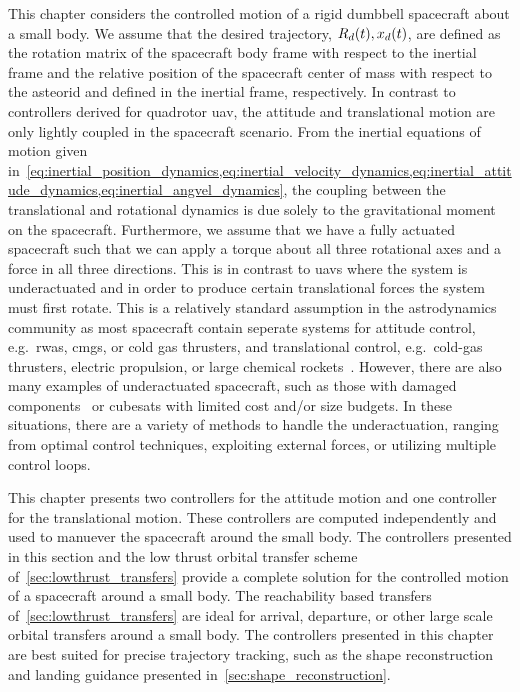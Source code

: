 This chapter considers the controlled motion of a rigid dumbbell spacecraft about a small body.
We assume that the desired trajectory, \( R_d(t), x_d(t) \), are defined as the rotation matrix of the spacecraft body frame with respect to the inertial frame and the relative position of the spacecraft center of mass with respect to the asteorid and defined in the inertial frame, respectively.
In contrast to controllers derived for quadrotor \gls{uav}, the attitude and translational motion are only lightly coupled in the spacecraft scenario.
From the inertial equations of motion given in~\cref{eq:inertial_position_dynamics,eq:inertial_velocity_dynamics,eq:inertial_attitude_dynamics,eq:inertial_angvel_dynamics}, the coupling between the translational and rotational dynamics is due solely to the gravitational moment on the spacecraft.
Furthermore, we assume that we have a fully actuated spacecraft such that we can apply a torque about all three rotational axes and a force in all three directions.
This is in contrast to \glspl{uav} where the system is underactuated and in order to produce certain translational forces the system must first rotate.
This is a relatively standard assumption in the astrodynamics community as most spacecraft contain seperate systems for attitude control, e.g.\ \glspl{rwa}, \glspl{cmg}, or cold gas thrusters, and translational control, e.g.\ cold-gas thrusters, electric propulsion, or large chemical rockets~\cite{hughes2004,wertz1978}.
However, there are also many examples of underactuated spacecraft, such as those with damaged components~\cite{petersen2015a} or cubesats with limited cost and/or size budgets.
In these situations, there are a variety of methods to handle the underactuation, ranging from optimal control techniques, exploiting external forces, or utilizing multiple control loops.

This chapter presents two controllers for the attitude motion and one controller for the translational motion. 
These controllers are computed independently and used to manuever the spacecraft around the small body.
The controllers presented in this section and the low thrust orbital transfer scheme of~\cref{sec:lowthrust_transfers} provide a complete solution for the controlled motion of a spacecraft around a small body.
The reachability based transfers of~\cref{sec:lowthrust_transfers} are ideal for arrival, departure, or other large scale orbital transfers around a small body.
The controllers presented in this chapter are best suited for precise trajectory tracking, such as the shape reconstruction and landing guidance presented in~\cref{sec:shape_reconstruction}.

